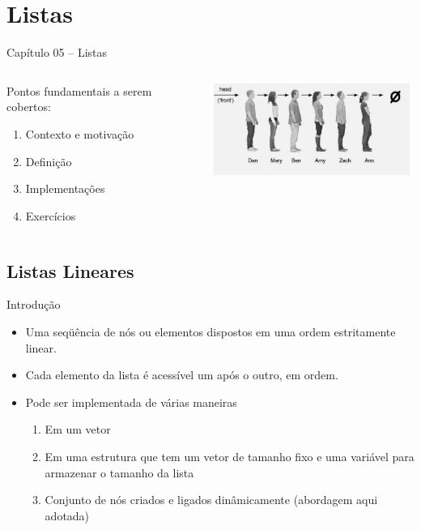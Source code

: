 
\section{Listas}

\begin{frame}

\begin{center}
{\Large Capítulo 05 -- Listas}
\end{center}

\begin{columns}
\begin{column}{.5\textwidth}
\centering
Pontos fundamentais a serem cobertos:
  \begin{enumerate}
  \item Contexto e motivação
  \item Definição
  \item Implementações
  \item Exercícios 
\end{enumerate}  

\end{column}
\begin{column}{.5\textwidth}
\centering
\includegraphics[height=3cm, width=7cm]{figs/fig_listas/ilustra_lista.jpg}
\end{column}
\end{columns}


\end{frame}



\subsection{Listas Lineares}
  \begin{frame}{Introdução}    
		\begin{itemize}
			\item Uma seqüência de nós ou elementos dispostos em uma ordem estritamente linear.
			\item Cada elemento da lista é acessível um após o outro, em ordem.
			\item Pode ser implementada de várias maneiras			
				\begin{enumerate}
					\item Em um vetor
					\item Em uma estrutura que tem um vetor de tamanho fixo e uma 
					variável para armazenar o tamanho da lista
					\item Conjunto de nós criados e ligados dinâmicamente (abordagem aqui adotada)
				\end{enumerate}
		\end{itemize}
  \end{frame}
  
